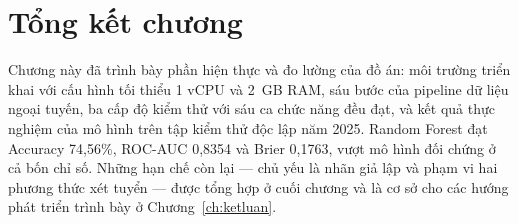 \section{Tổng kết chương}

Chương này đã trình bày phần hiện thực và đo lường của đồ án: môi trường triển khai
với cấu hình tối thiểu 1 vCPU và 2~GB RAM, sáu bước của pipeline dữ liệu ngoại tuyến,
ba cấp độ kiểm thử với sáu ca chức năng đều đạt, và kết quả thực nghiệm của mô hình
trên tập kiểm thử độc lập năm 2025. Random Forest đạt Accuracy 74,56\%, ROC-AUC
0,8354 và Brier 0,1763, vượt mô hình đối chứng ở cả bốn chỉ số. Những hạn chế còn lại
--- chủ yếu là nhãn giả lập và phạm vi hai phương thức xét tuyển --- được tổng hợp ở
cuối chương và là cơ sở cho các hướng phát triển trình bày ở
Chương~\ref{ch:ketluan}.
